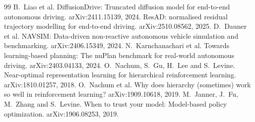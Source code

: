\documentclass[10pt,twocolumn]{article}
\theoremstyle{remark}
\begin{document}
\begin{thebibliography}{99}
 B.~Liao et al. DiffusionDrive: Truncated diffusion model for end-to-end autonomous driving. arXiv:2411.15139, 2024.
 ResAD: normalised residual trajectory modelling for end-to-end driving. arXiv:2510.08562, 2025.
 D.~Dauner et al. NAVSIM: Data-driven non-reactive autonomous vehicle simulation and benchmarking. arXiv:2406.15349, 2024.
 N.~Karnchanachari et al. Towards learning-based planning: The nuPlan benchmark for real-world autonomous driving. arXiv:2403.04133, 2024.
 O.~Nachum, S.~Gu, H.~Lee and S.~Levine. Near-optimal representation learning for hierarchical reinforcement learning. arXiv:1810.01257, 2018.
 O.~Nachum et al. Why does hierarchy (sometimes) work so well in reinforcement learning? arXiv:1909.10618, 2019.
 M.~Janner, J.~Fu, M.~Zhang and S.~Levine. When to trust your model: Model-based policy optimization. arXiv:1906.08253, 2019.
\end{thebibliography}
\end{document}
